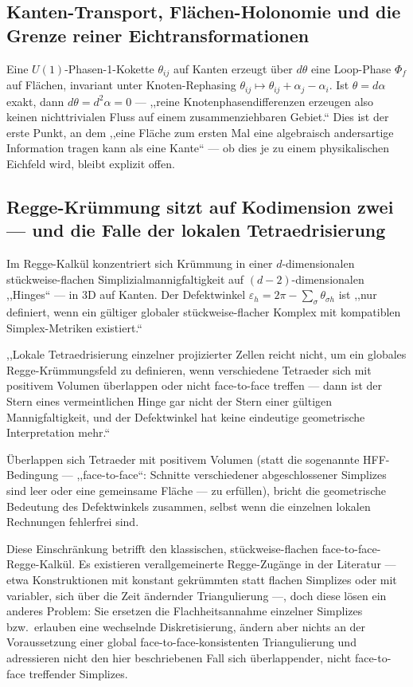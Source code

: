 \subsection{Kanten-Transport, Flächen-Holonomie und die Grenze reiner Eichtransformationen}

Eine $U(1)$-Phasen-1-Kokette $\theta_{ij}$ auf Kanten erzeugt über $d\theta$
eine Loop-Phase $\Phi_f$ auf Flächen, invariant unter Knoten-Rephasing
$\theta_{ij}\mapsto\theta_{ij}+\alpha_j-\alpha_i$. Ist $\theta=d\alpha$
exakt, dann $d\theta=d^2\alpha=0$ — ,,reine Knotenphasendifferenzen
erzeugen also keinen nichttrivialen Fluss auf einem zusammenziehbaren
Gebiet.`` Dies ist der erste Punkt, an dem ,,eine Fläche zum ersten Mal
eine algebraisch andersartige Information tragen kann als eine Kante`` —
ob dies je zu einem physikalischen Eichfeld wird, bleibt explizit offen.

\subsection{Regge-Krümmung sitzt auf Kodimension zwei — und die Falle der lokalen Tetraedrisierung}

Im Regge-Kalkül konzentriert sich Krümmung in einer $d$-dimensionalen
stückweise-flachen Simplizialmannigfaltigkeit auf $(d-2)$-dimensionalen
,,Hinges`` — in 3D auf Kanten. Der Defektwinkel
$\varepsilon_h=2\pi-\sum_\sigma\theta_{\sigma h}$ ist ,,nur definiert, wenn
ein gültiger globaler stückweise-flacher Komplex mit kompatiblen
Simplex-Metriken existiert.``

\begin{kernbox}[title={Die entscheidende Voraussetzung}]
,,Lokale Tetraedrisierung einzelner projizierter Zellen reicht nicht, um
ein globales Regge-Krümmungsfeld zu definieren, wenn verschiedene
Tetraeder sich mit positivem Volumen überlappen oder nicht face-to-face
treffen — dann ist der Stern eines vermeintlichen Hinge gar nicht der
Stern einer gültigen Mannigfaltigkeit, und der Defektwinkel hat keine
eindeutige geometrische Interpretation mehr.``
\end{kernbox}

Überlappen sich Tetraeder mit positivem Volumen (statt die sogenannte
HFF-Bedingung — ,,face-to-face``: Schnitte verschiedener abgeschlossener
Simplizes sind leer oder eine gemeinsame Fläche — zu erfüllen), bricht die
geometrische Bedeutung des Defektwinkels zusammen, selbst wenn die
einzelnen lokalen Rechnungen fehlerfrei sind.

Diese Einschränkung betrifft den klassischen, stückweise-flachen
face-to-face-Regge-Kalkül. Es existieren verallgemeinerte Regge-Zugänge
in der Literatur — etwa Konstruktionen mit konstant gekrümmten statt
flachen Simplizes \cite{BahrDittrich2009} oder mit variabler, sich über
die Zeit ändernder Triangulierung \cite{DittrichHoehn2012} —, doch diese
lösen ein anderes Problem: Sie ersetzen die Flachheitsannahme einzelner
Simplizes bzw.\ erlauben eine wechselnde Diskretisierung, ändern aber
nichts an der Voraussetzung einer global face-to-face-konsistenten
Triangulierung und adressieren nicht den hier beschriebenen Fall sich
überlappender, nicht face-to-face treffender Simplizes.

